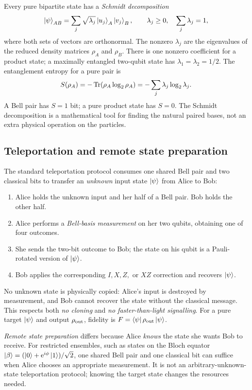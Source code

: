 Every pure bipartite state has a \emph{Schmidt decomposition}
\begin{equation}\label{eq:schmidt}
\left\lvert \psi\right\rangle_{AB}=\sum_j\sqrt{\lambda_j}\left\lvert u_j\right\rangle_A\left\lvert v_j\right\rangle_B,\qquad
\lambda_j\geq0,\quad\sum_j\lambda_j=1,
\end{equation}
where both sets of vectors are orthonormal. The nonzero $\lambda_j$ are the eigenvalues of the reduced density matrices $\rho_A$ and $\rho_B$. There is one nonzero coefficient for a product state; a maximally entangled two-qubit state has $\lambda_1=\lambda_2=1/2$. The entanglement entropy for a pure pair is
\begin{equation}\label{eq:entropy}
S(\rho_A)=-\operatorname{Tr}(\rho_A\log_2\rho_A)=-\sum_j\lambda_j\log_2\lambda_j.
\end{equation}
A Bell pair has $S=1$ bit; a pure product state has $S=0$. The Schmidt decomposition is a mathematical tool for finding the natural paired bases, not an extra physical operation on the particles.

\subsection{Teleportation and remote state preparation}
The standard teleportation protocol consumes one shared Bell pair and two classical bits to transfer an \emph{unknown} input state $\left\lvert \psi\right\rangle$ from Alice to Bob:
\begin{enumerate}
\item Alice holds the unknown input and her half of a Bell pair. Bob holds the other half.
\item Alice performs a \emph{Bell-basis measurement} on her two qubits, obtaining one of four outcomes.
\item She sends the two-bit outcome to Bob; the state on his qubit is a Pauli-rotated version of $\left\lvert \psi\right\rangle$.
\item Bob applies the corresponding $I,X,Z,$ or $XZ$ correction and recovers $\left\lvert \psi\right\rangle$.
\end{enumerate}
No unknown state is physically copied: Alice's input is destroyed by measurement, and Bob cannot recover the state without the classical message. This respects both \emph{no cloning} and \emph{no faster-than-light signalling}. For a pure target $\left\lvert \psi\right\rangle$ and output $\rho_{\rm out}$, fidelity is $F=\left\langle \psi\right\rvert\rho_{\rm out}\left\lvert \psi\right\rangle$.

\emph{Remote state preparation} differs because Alice \emph{knows} the state she wants Bob to receive. For restricted ensembles, such as states on the Bloch equator $\left\lvert \beta\right\rangle=(\left\lvert 0\right\rangle+\mathrm{e}^{i\phi}\left\lvert 1\right\rangle)/\sqrt2$, one shared Bell pair and one classical bit can suffice when Alice chooses an appropriate measurement. It is not an arbitrary-unknown-state teleportation protocol; knowing the target state changes the resources needed.

